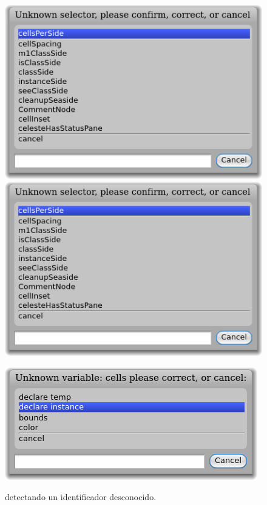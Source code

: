 \documentclass[a4paper,10pt,twoside]{book}
\begin{document}
\begin{figure}[htb]
\begin{minipage}{0.48\textwidth}
	\centering
	\ifluluelse
		{\includegraphics[width=\textwidth]{UnknownSelector}}
		{\includegraphics[scale=0.7]{UnknownSelector}}
 \caption{\pharo detectando un identificador desconocido.}
\end{minipage}
\hfill
\begin{minipage}{0.48\textwidth}
	\centering
	\ifluluelse
		{\includegraphics[width=\textwidth]{DeclareInstanceVar}}

\end{minipage}
\end{figure}
\end{document}
